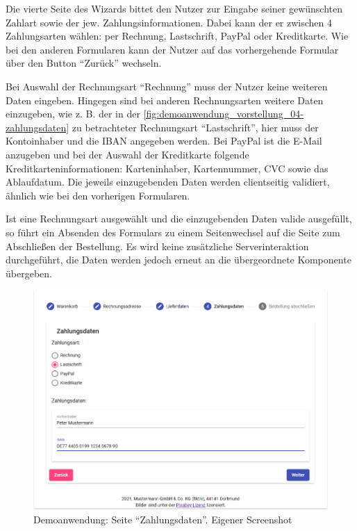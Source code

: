 Die vierte Seite des Wizards bittet den Nutzer zur Eingabe seiner gewünschten Zahlart sowie der jew. Zahlungsinformationen. Dabei kann der er zwischen 4 Zahlungsarten wählen: per Rechnung, Lastschrift, PayPal oder Kreditkarte. Wie bei den anderen Formularen kann der Nutzer auf das vorhergehende Formular über den Button \enquote{Zurück} wechseln.

Bei Auswahl der Rechnungsart \enquote{Rechnung} muss der Nutzer keine weiteren Daten eingeben. Hingegen sind bei anderen Rechnungsarten weitere Daten einzugeben, wie z. B. der in der \autoref{fig:demoanwendung_vorstellung_04-zahlungsdaten} zu betrachteter Rechnungsart \enquote{Lastschrift}, hier muss der Kontoinhaber und die IBAN angegeben werden. Bei PayPal ist die E-Mail anzugeben und bei der Auswahl der Kreditkarte folgende Kreditkarteninformationen: Karteninhaber, Kartennummer, CVC sowie das Ablaufdatum. Die jeweils einzugebenden Daten werden clientseitig validiert, ähnlich wie bei den vorherigen Formularen.

Ist eine Rechnungsart ausgewählt und die einzugebenden Daten valide ausgefüllt, so führt ein Absenden des Formulars zu einem Seitenwechsel auf die Seite zum Abschließen der Bestellung. Es wird keine zusätzliche Serverinteraktion durchgeführt, die Daten werden jedoch erneut an die übergeordnete Komponente übergeben.

\begin{figure}[H]
	\centering
	\includegraphics[width=0.85\linewidth]{img/04_erstellung-poc/demoanwendung_vorstellung_04-zahlungsdaten.png}
	\caption{Demoanwendung: Seite \enquote{Zahlungsdaten}. Eigener Screenshot}
	\label{fig:demoanwendung_vorstellung_04-zahlungsdaten}
\end{figure}

